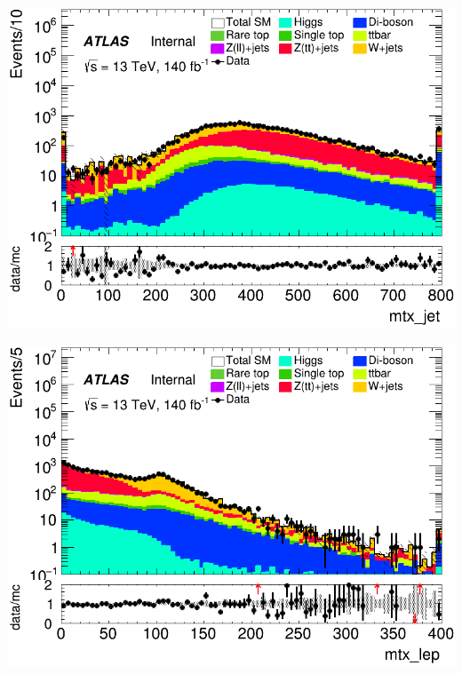 \documentclass[usenames,dvipsnames]{beamer}
\begin{document}
\begin{frame}
    \begin{minipage}{0.32\textwidth}
        \centering
        \includegraphics[width=\textwidth]{graphics/HH_met/HH_met_mtx_jet.png}
    \end{minipage}
        \hfill
    \begin{minipage}{0.32\textwidth}
        \centering
        \includegraphics[width=\textwidth]{graphics/HH_met/HH_met_mtx_lep.png}
    \end{minipage}
    \hfill
    \begin{minipage}{0.32\textwidth}
        \centering

\end{minipage}
\end{frame}
\end{document}
